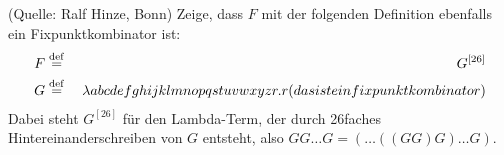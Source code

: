 \begin{aufgabe} (Quelle: Ralf Hinze, Bonn)
  Zeige, dass $F$ mit der folgenden Definition ebenfalls ein
  Fixpunktkombinator ist:
  \begin{eqnarray*}
    F &\stackrel{\rm def}{=}{}& G^{[26]}
    \\
    G &\stackrel{\rm def}{=}{}& \lambda abcdefghijklmnopqstuvwxyzr.r(dasisteinfixpunktkombinator)
  \end{eqnarray*}
  Dabei steht $G^{[26]}$ für den Lambda-Term, der durch 26faches
  Hintereinanderschreiben von $G$ entsteht, also $GG\ldots G = (\ldots
  ((G G) G)\ldots G)$.
  

\end{aufgabe}

